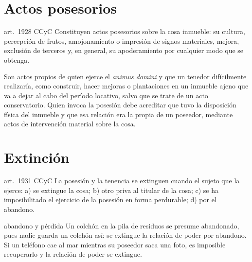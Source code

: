 \documentclass[12pt,oneside]{book}
\begin{document}
\section{Actos posesorios}

\begin{regla}{art.~1928 CCyC}
Constituyen actos posesorios sobre la cosa inmueble: su cultura, percepción de frutos, amojonamiento o impresión de signos materiales, mejora, exclusión de terceros y, en general, su apoderamiento por cualquier modo que se obtenga.
\end{regla}

Son actos propios de quien ejerce el \textit{animus domini} y que un tenedor difícilmente realizaría, como construir, hacer mejoras o plantaciones en un inmueble ajeno que va a dejar al cabo del período locativo, salvo que se trate de un acto conservatorio. Quien invoca la posesión debe acreditar que tuvo la disposición física del inmueble y que esa relación era la propia de un poseedor, mediante actos de intervención material sobre la cosa.

\section{Extinción}

\begin{regla}{art.~1931 CCyC}
La posesión y la tenencia se extinguen cuando el sujeto que la ejerce: a) se extingue la cosa; b) otro priva al titular de la cosa; c) se ha imposibilitado el ejercicio de la posesión en forma perdurable; d) por el abandono.
\end{regla}

\begin{ejemplo}{abandono y pérdida}
Un colchón en la pila de residuos se presume abandonado, pues nadie guarda un colchón así: se extingue la relación de poder por abandono. Si un teléfono cae al mar mientras su poseedor saca una foto, es imposible recuperarlo y la relación de poder se extingue.
\end{ejemplo}
\end{document}
